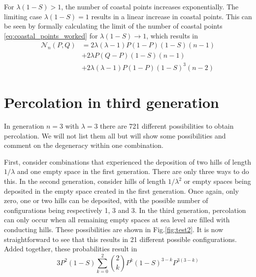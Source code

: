 \documentclass[amsmath,amssymb,amsfonts,aps,pre,preprint,superscriptaddress,bibnotes,showpacs,showkeys,longbibliography,nofootinbib]{revtex4-1}
\begin{document}
For $\lambda (1-S)>1$, the number of coastal points increases exponentially. The limiting case $\lambda (1-S)=1$ results in a linear increase in coastal points. This can be seen by formally calculating the limit of the number of coastal points \eqref{eq:coastal_points_worked} for $\lambda(1-S)\rightarrow1$, which results in
\begin{equation}
    \begin{split}
        \mathcal{N}_n(P,Q) &= 2 \lambda (\lambda-1)P(1-P)(1-S)(n-1)\\
        &+ 2\lambda P(Q-P)(1-S) (n-1)\\
        &+ 2\lambda(\lambda-1)P(1-P)(1-S)^3 (n-2)
    \end{split}
\end{equation}

\section{Percolation in third generation}\label{app:2}
In generation $n=3$ with $\lambda=3$ there are 721 different possibilities to obtain percolation. We will not list them all but will show some possibilities and comment on the degeneracy within one combination. 

First, consider combinations that experienced the deposition of two hills of length $1/\lambda$ and one empty space in the first generation. There are only three ways to do this. In the second generation, consider hills of length $1/\lambda^2$ or empty spaces being deposited in the empty space created in the first generation. Once again, only zero, one or two hills can be deposited, with the possible number of configurations being respectively 1, 3 and 3. In the third generation, percolation can only occur when all remaining empty spaces at sea level are filled with conducting hills. These possibilities are shown in Fig.\ref{fig:test2}. It is now straightforward to see that this results in 21 different possible configurations. Added together, these probabilities result in
\begin{equation}
    3 P^2 (1-S) \sum\limits_{k=0}^2{2\choose k}P^k (1-S)^{3-k}P^{3 (3-k)}
\end{equation}
\end{document}
